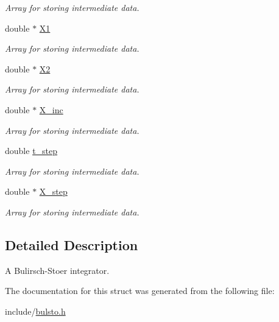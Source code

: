 \begin{DoxyCompactItemize}
\begin{DoxyCompactList}\small\item\em Array for storing intermediate data. \end{DoxyCompactList}\item 
\hypertarget{structbulsto_ae042d246b8cc4fc2dca7eeb2b7de41a0}{}double $\ast$ \hyperlink{structbulsto_ae042d246b8cc4fc2dca7eeb2b7de41a0}{X1}\label{structbulsto_ae042d246b8cc4fc2dca7eeb2b7de41a0}

\begin{DoxyCompactList}\small\item\em Array for storing intermediate data. \end{DoxyCompactList}\item 
\hypertarget{structbulsto_a07d3f69a611b1f3d346615d8936672ce}{}double $\ast$ \hyperlink{structbulsto_a07d3f69a611b1f3d346615d8936672ce}{X2}\label{structbulsto_a07d3f69a611b1f3d346615d8936672ce}

\begin{DoxyCompactList}\small\item\em Array for storing intermediate data. \end{DoxyCompactList}\item 
\hypertarget{structbulsto_ad3ed4caf9c6fac621f0712b5162c0948}{}double $\ast$ \hyperlink{structbulsto_ad3ed4caf9c6fac621f0712b5162c0948}{X\+\_\+inc}\label{structbulsto_ad3ed4caf9c6fac621f0712b5162c0948}

\begin{DoxyCompactList}\small\item\em Array for storing intermediate data. \end{DoxyCompactList}\item 
\hypertarget{structbulsto_aa8ddc55838fa4eef090464cd6c523b1b}{}double \hyperlink{structbulsto_aa8ddc55838fa4eef090464cd6c523b1b}{t\+\_\+step}\label{structbulsto_aa8ddc55838fa4eef090464cd6c523b1b}

\begin{DoxyCompactList}\small\item\em Array for storing intermediate data. \end{DoxyCompactList}\item 
\hypertarget{structbulsto_abda965d700144ad6697fb51a52c15d19}{}double $\ast$ \hyperlink{structbulsto_abda965d700144ad6697fb51a52c15d19}{X\+\_\+step}\label{structbulsto_abda965d700144ad6697fb51a52c15d19}

\begin{DoxyCompactList}\small\item\em Array for storing intermediate data. \end{DoxyCompactList}\end{DoxyCompactItemize}


\subsection{Detailed Description}
A Bulirsch-\/\+Stoer integrator. 

The documentation for this struct was generated from the following file\+:\begin{DoxyCompactItemize}
\item 
include/\hyperlink{bulsto_8h}{bulsto.\+h}\end{DoxyCompactItemize}

